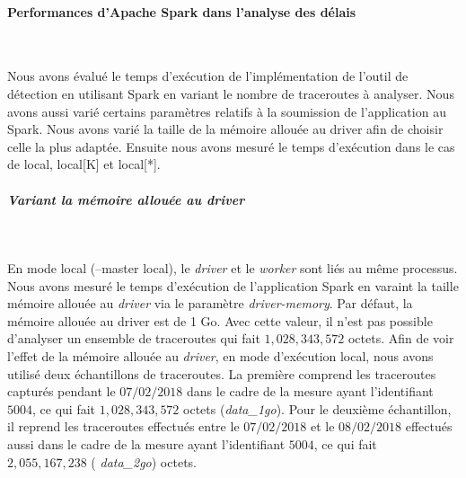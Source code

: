 \paragraph{Performances d'Apache Spark dans l'analyse des délais }~


Nous avons évalué le temps d'exécution de l'implémentation de l'outil de détection en utilisant Spark en variant le nombre de traceroutes à analyser. Nous avons aussi varié certains paramètres relatifs à la soumission de l'application au Spark. Nous avons varié la taille de la mémoire allouée au driver afin de choisir celle la plus adaptée. Ensuite nous avons mesuré le temps d'exécution dans le cas de local, local[K] et local[*].
\newpage
\subparagraph{Variant la mémoire allouée au driver}~

En mode local (--master local), le \textit{driver} et le \textit{worker} sont liés au même processus.  Nous avons mesuré le temps d'exécution de l'application Spark en varaint la taille mémoire allouée au \textit{driver} via le paramètre \textit{driver-memory}. Par défaut, la mémoire allouée au driver est de 1 Go. Avec cette valeur, il n'est pas possible  d'analyser un ensemble de traceroutes qui fait $ 1,028,343,572 $ octets. Afin de voir l'effet de la mémoire allouée au \textit{driver}, en mode d'exécution local, nous avons utilisé deux échantillons de traceroutes. La première comprend les traceroutes capturés pendant le $ 07/02/2018 $ dans le cadre de la mesure ayant l'identifiant $ 5004 $, ce qui fait $ 1,028,343,572 $ octets (\textit{data\_1go}). Pour le deuxième échantillon, il reprend les traceroutes effectués  entre le $ 07/02/2018 $ et le $ 08/02/2018 $ effectués aussi dans le cadre de la mesure ayant l'identifiant $ 5004 $, ce qui fait $ 2,055,167,238 $ (\textit{ data\_2go}) octets.

